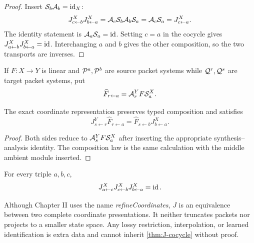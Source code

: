 \begin{proof}
Insert $\mathcal S_b\mathcal A_b=\operatorname{id}_X$:
\[
J^X_{c\leftarrow b}J^X_{b\leftarrow a}
=\mathcal A_c\mathcal S_b\mathcal A_b\mathcal S_a
=\mathcal A_c\mathcal S_a
=J^X_{c\leftarrow a}.
\]
The identity statement is $\mathcal A_a\mathcal S_a=\operatorname{id}$.  Setting $c=a$ in the cocycle
gives $J^X_{a\leftarrow b}J^X_{b\leftarrow a}=\operatorname{id}$. Interchanging $a$ and $b$
gives the other composition, so the two transports are inverses.
\end{proof}

If $F:X\to Y$ is linear and $\mathcal P^a,\mathcal P^b$ are source packet systems while
$\mathcal Q^r,\mathcal Q^s$ are target packet systems, put
\[
\widehat F_{r\leftarrow a}
=
\mathcal A^Y_rF\mathcal S^X_a.
\]

\begin{theorem}
\label{thm:canonical-naturality}
The exact coordinate representation preserves typed composition and satisfies
\[
J^Y_{s\leftarrow r}\widehat F_{r\leftarrow a}
=
\widehat F_{s\leftarrow b}J^X_{b\leftarrow a}.
\]
\end{theorem}

\begin{proof}
Both sides reduce to $\mathcal A^Y_sF\mathcal S^X_a$ after inserting the appropriate
synthesis--analysis identity.  The composition law is the same calculation
with the middle ambient module inserted.
\end{proof}

\begin{corollary}
\label{cor:J-flat}
For every triple $a,b,c$,
\[
J^X_{a\leftarrow c}J^X_{c\leftarrow b}J^X_{b\leftarrow a}=\operatorname{id}.
\]
\end{corollary}

\begin{boundary}
Although Chapter II uses the name \emph{refineCoordinates}, $J$ is an
equivalence between two complete coordinate presentations.  It neither
truncates packets nor projects to a smaller state space.  Any lossy
restriction, interpolation, or learned identification is extra data and
cannot inherit \cref{thm:J-cocycle} without proof.
\end{boundary}

